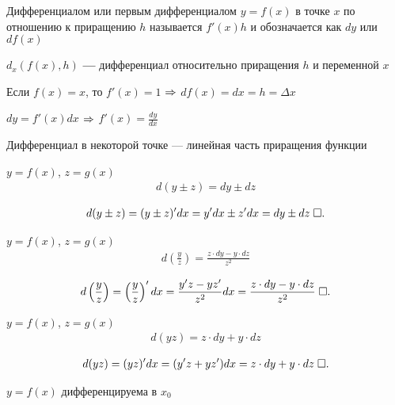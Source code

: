 \documentclass{article}
\begin{document}


Дифференциалом или первым дифференциалом $y=f(x)$ в точке $x$ по отношению к приращению $h$ называется $f'(x)h$ и обозначается как $dy$ или $df(x)$

$d_x(f(x), h)$ \textbf{---} дифференциал относительно приращения $h$ и переменной $x$

Если $f(x)=x$, то $f'(x)=1$ $\Rarr$ $df(x)=dx=h=\Delta x$

$dy=f'(x)dx$ $\Rarr$ $f'(x)=\frac{dy}{dx}$


Дифференциал в некоторой точке --- линейная часть  приращения функции


\theorem

$y=f(x)$, $z=g(x)$
\begin{align*}
	d(y\pm z)=dy\pm dz
\end{align*}

\proof
\begin{align*}
	d(y\pm z)=(y\pm z)'dx =y'dx\pm z'dx=dy\pm dz\qed
\end{align*}

\theorem

$y=f(x)$, $z=g(x)$
\begin{align*}
	d\left(\frac{y}{z}\right)=\frac{z \cdot dy-y \cdot dz}{z^{2}}
\end{align*}

\proof
\begin{align*}
	d\left(\frac{y}{z}\right)=\left(\frac{y}{z}\right)'dx =\frac{y'z-yz'}{z^{2}}dx=\frac{z \cdot dy-y \cdot dz}{z^{2}}\qed
\end{align*}

\theorem

$y=f(x)$, $z=g(x)$
\begin{align*}
	d(yz)=z \cdot dy+y \cdot dz
\end{align*}

\proof
\begin{align*}
	d(yz)=(yz)'dx=(y'z+yz')dx=z \cdot dy+y \cdot dz\qed
\end{align*}

\pagebreak

\theorem

$y=f(x)$ дифференцируема в $x_0$
\end{document}
